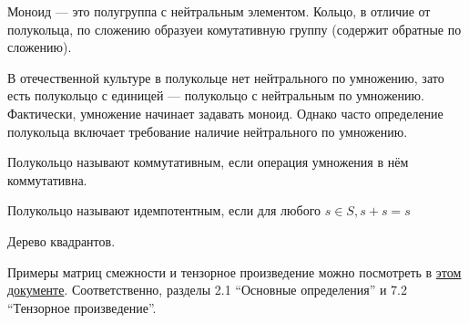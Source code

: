 Моноид --- это полугруппа с нейтральным элементом.
Кольцо, в отличие от полукольца, по сложению образуеи комутативную группу (содержит обратные по сложению).

В отечественной культуре в полукольце нет нейтрального по умножению, зато есть полукольцо с единицей --- полукольцо с нейтральным по умножению. Фактически, умножение начинает задавать моноид. Однако часто определение полукольца включает требование наличие нейтрального по умножению.

Полукольцо называют коммутативным, если операция умножения в нём коммутативна.

Полукольцо называют идемпотентным, если для любого $s \in S, s + s = s$

    
    
Дерево квадрантов.  
    

Примеры матриц смежности и тензорное произведение можно посмотреть в \href{https://github.com/YaccConstructor/articles/blob/master/InProgress/Formal_langs_CFPQ_course_notes/Formal_lang_CFPQ_course_notes.pdf}{этом документе}. Соответственно, разделы 2.1 ``Основные определения'' и 7.2 ``Тензорное произведение''.
